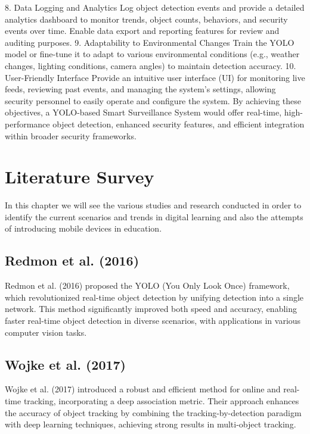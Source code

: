 \documentclass[openany,12pt]{report}
\begin{document}
\hspace*{0.5in}8. Data Logging and Analytics
Log object detection events and provide a detailed analytics dashboard to monitor trends, object counts, behaviors, and security events over time.
Enable data export and reporting features for review and auditing purposes.\newline
\hspace*{0.5in}9. Adaptability to Environmental Changes
Train the YOLO model or fine-tune it to adapt to various environmental conditions (e.g., weather changes, lighting conditions, camera angles) to maintain detection accuracy.\newline
\hspace*{0.5in}10. User-Friendly Interface
Provide an intuitive user interface (UI) for monitoring live feeds, reviewing past events, and managing the system’s settings, allowing security personnel to easily operate and configure the system.
By achieving these objectives, a YOLO-based Smart Surveillance System would offer real-time, high-performance object detection, enhanced security features, and efficient integration within broader security frameworks.

\chapter{Literature Survey}

\hspace*{0.5in}In this chapter we will see the various studies and research conducted in order to identify the current scenarios and trends in digital learning and also the attempts of introducing mobile devices in education.

\section{Redmon et al. (2016)}
Redmon et al. (2016) proposed the YOLO (You Only Look Once) framework, which revolutionized real-time object detection by unifying detection into a single network. This method significantly improved both speed and accuracy, enabling faster real-time object detection in diverse scenarios, with applications in various computer vision tasks. 

\section{Wojke et al. (2017)}
Wojke et al. (2017) introduced a robust and efficient method for online and real-time tracking, incorporating a deep association metric. Their approach enhances the accuracy of object tracking by combining the tracking-by-detection paradigm with deep learning techniques, achieving strong results in multi-object tracking. 
\end{document}

